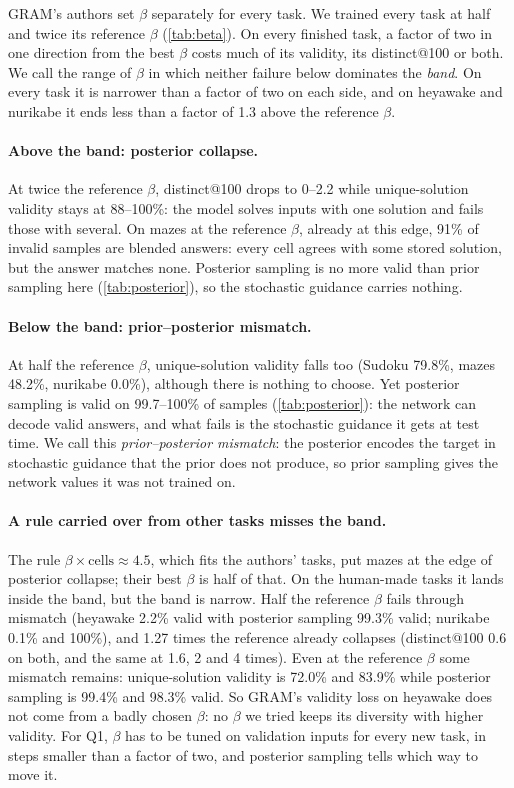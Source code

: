 \documentclass{article}
\begin{document}
GRAM's authors set $\beta$ separately for every task. We trained every task at half and twice its reference $\beta$
(\cref{tab:beta}). On every finished task, a factor of two in one direction from the best $\beta$ costs much of its
validity, its distinct@100 or both. We call the range of $\beta$ in which neither failure below dominates the
\emph{band}. On every task it is narrower than a factor of two on each side, and on heyawake and nurikabe it ends
less than a factor of 1.3 above the reference $\beta$.

\paragraph{Above the band: posterior collapse.} At twice the reference $\beta$, distinct@100 drops to 0--2.2 while
unique-solution validity stays at 88--100\%: the model solves inputs with one solution and fails those with several.
On mazes at the reference $\beta$, already at this edge, 91\% of invalid samples are blended answers: every cell
agrees with some stored solution, but the answer matches none. Posterior sampling is no more valid than prior sampling
here (\cref{tab:posterior}), so the stochastic guidance carries nothing.

\paragraph{Below the band: prior--posterior mismatch.} At half the reference $\beta$, unique-solution validity falls
too (Sudoku 79.8\%, mazes 48.2\%, nurikabe 0.0\%), although there is nothing to choose. Yet posterior sampling is
valid on 99.7--100\%
of samples (\cref{tab:posterior}): the network can decode valid answers, and what fails is the stochastic guidance it
gets at test time. We call this \emph{prior--posterior mismatch}: the posterior encodes the target in stochastic
guidance that the prior does not produce, so prior sampling gives the network values it was not trained on.

\paragraph{A rule carried over from other tasks misses the band.} The rule $\beta\times\text{cells}\approx4.5$, which
fits the authors' tasks, put mazes at the edge of posterior collapse; their best $\beta$ is half of that. On the
human-made tasks it lands inside the band, but the band is narrow. Half the reference $\beta$ fails through mismatch
(heyawake 2.2\% valid with posterior sampling 99.3\% valid; nurikabe 0.1\% and 100\%), and 1.27 times the reference
already collapses (distinct@100 0.6 on both, and the same at 1.6, 2 and 4 times). Even at the reference $\beta$ some
mismatch remains: unique-solution validity is 72.0\% and 83.9\% while posterior sampling is 99.4\% and 98.3\% valid.
So GRAM's validity loss on heyawake does not come from a badly chosen $\beta$: no $\beta$ we tried keeps its
diversity with higher validity. For Q1, $\beta$ has to be tuned on validation inputs for every new task, in steps
smaller than a factor of two, and posterior sampling tells which way to move it.
\end{document}
